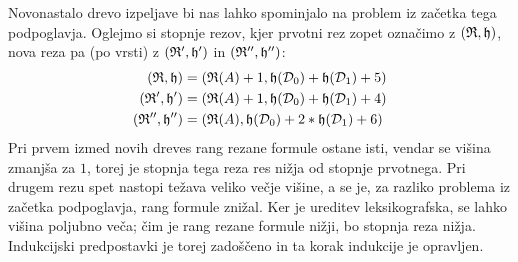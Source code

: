 \dol
\begin{prooftree}



\end{prooftree}
Novonastalo drevo izpeljave bi nas lahko spominjalo na problem iz začetka tega podpoglavja. Oglejmo si stopnje rezov, kjer prvotni rez zopet označimo z $(\R,\h)$, nova reza pa (po vrsti) z $(\R',\h')$ in $(\R'',\h'')$:
\begin{align*}
    (\R,\h) &= (\R(A) + 1,\h(\D_0) + \h(\D_1) + 5)\\
    (\R',\h') &= (\R(A) + 1,\h(\D_0) + \h(\D_1) + 4)\\
    (\R'',\h'') &= (\R(A),\h(\D_0) + 2*\h(\D_1) + 6)
\end{align*}
Pri prvem izmed novih dreves rang rezane formule ostane isti, vendar se višina zmanjša za $1$, torej je stopnja tega reza res nižja od stopnje prvotnega. Pri drugem rezu spet nastopi težava veliko večje višine, a se je, za razliko problema iz začetka podpoglavja, rang formule znižal. Ker je ureditev leksikografska, se lahko višina poljubno veča; čim je rang rezane formule nižji, bo stopnja reza nižja. Indukcijski predpostavki je torej zadoščeno in ta korak indukcije je opravljen.
